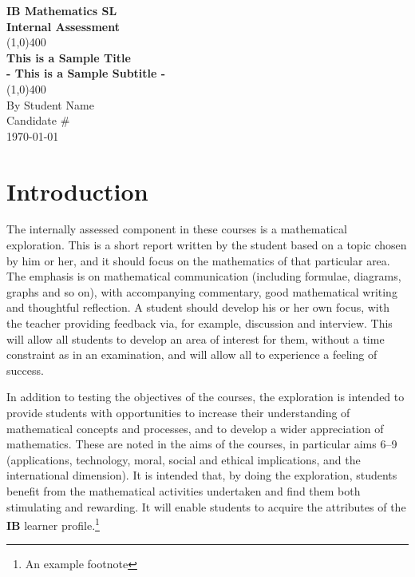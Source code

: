 \documentclass[11pt]{article}
\begin{document}
\begin{titlepage}
\begin{center}
\vspace*{1cm}
\Large{\textbf{IB Mathematics SL}}\\
\Large{\textbf{Internal Assessment}}\\
\vfill
\line(1,0){400}\\[1mm]
\huge{\textbf{This is a Sample Title}}\\[3mm]
\Large{\textbf{- This is a Sample Subtitle -}}\\[1mm]
\line(1,0){400}\\
\vfill
By Student Name\\
Candidate \# \\
\today
\end{center}
\end{titlepage}

\tableofcontents
\thispagestyle{empty}
\clearpage

\section{Introduction}

The internally assessed component in these courses is a mathematical exploration. 
This is a short report written by the student based on a topic chosen by him or her, 
and it should focus on the mathematics of that particular area. The emphasis is on 
mathematical communication (including formulae, diagrams, graphs and so on), with 
accompanying commentary, good mathematical writing and thoughtful reflection. 
A student should develop his or her own focus, with the teacher providing feedback 
via, for example, discussion and interview. This will allow all students to develop an 
area of interest for them, without a time constraint as in an examination, and will allow 
all to experience a feeling of success. \cite{DBHS1}

In addition to testing the objectives of the courses, the exploration is intended to provide 
students with opportunities to increase their understanding of mathematical concepts and 
processes, and to develop a wider appreciation of mathematics. These are noted in the aims 
of the courses, in particular aims 6–9 (applications, technology, moral, social and ethical 
implications, and the international dimension). It is intended that, by doing the exploration, 
students benefit from the mathematical activities undertaken and find them both stimulating 
and rewarding. It will enable students to acquire the attributes of the \textbf{IB} learner profile.\footnote{An example footnote}
\end{document}
